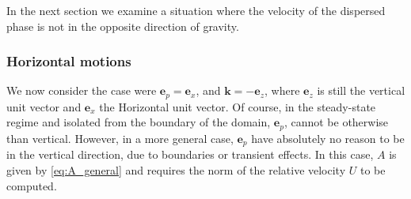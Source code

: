 In the next section we examine a situation where the velocity of the dispersed phase is not in the opposite direction of gravity. 



\subsubsection{Horizontal motions}

We now consider the case were $\textbf{e}_p = \textbf{e}_x$, and $\textbf{k} = - \textbf{e}_z$, where $\textbf{e}_z$ is still the vertical unit vector and $\textbf{e}_x$ the Horizontal unit vector. 
Of course, in the steady-state regime and isolated from the boundary of the domain, $\textbf{e}_p$, cannot be otherwise than vertical. 
However, in a more general case, $\textbf{e}_p$ have absolutely no reason to be in the vertical direction, due to boundaries or transient effects. 
In this case, $A$ is given by \ref{eq:A_general} and requires the norm of the relative velocity $U$ to be computed.

